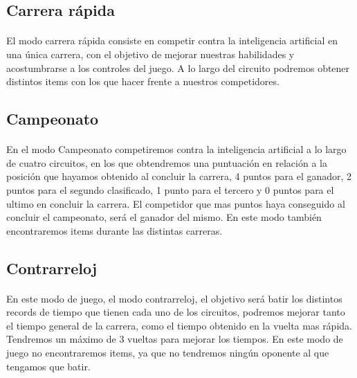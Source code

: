 \subsection{Carrera rápida}

\paragraph{}
El modo carrera rápida consiste en competir contra la inteligencia artificial en una única carrera, con el objetivo de 
mejorar nuestras habilidades y acostumbrarse a los controles del juego. A lo largo del circuito podremos obtener distintos
items con los que hacer frente a nuestros competidores.

\subsection{Campeonato}

\paragraph{}
En el modo Campeonato competiremos contra la inteligencia artificial a lo largo de cuatro circuitos, en los que obtendremos
una puntuación en relación a la posición que hayamos obtenido al concluir la carrera, 4 puntos para el ganador, 2 puntos para
el segundo clasificado, 1 punto para el tercero y 0 puntos para el ultimo en concluir la carrera. El competidor que mas puntos haya 
conseguido al concluir el campeonato, será el ganador del mismo. En este modo también encontraremos items durante las distintas carreras.

\subsection{Contrarreloj}

\paragraph{}
En este modo de juego, el modo contrarreloj, el objetivo será batir los distintos records de tiempo que tienen cada uno de los 
circuitos, podremos mejorar tanto el tiempo general de la carrera, como el tiempo obtenido en la vuelta mas rápida. Tendremos
un máximo de 3 vueltas para mejorar los tiempos. En este modo de juego no encontraremos items, ya que no tendremos ningún oponente
al que tengamos que batir.


